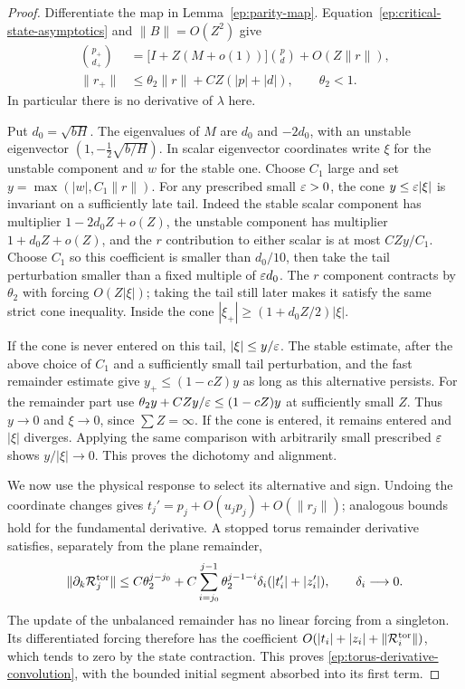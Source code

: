 \begin{proof}
Differentiate the map in Lemma~\ref{ep:parity-map}.
Equation~\eqref{ep:critical-state-asymptotics} and
$\|B\|=O(Z^2)$ give
\begin{align}
 \binom{p_+}{d_+}
 &=\bigl[I+Z(M+o(1))\bigr]\binom p d
       +O(Z\|r\|),\label{ep:critical-derivative}\\
 \|r_+\|&\le\theta_2\|r\|+
                     CZ(|p|+|d|),\qquad \theta_2<1.
                     \label{ep:derivative-remainder}
\end{align}
In particular there is no derivative of $\lambda$ here.

Put $d_0=\sqrt{bH}$.  The eigenvalues of $M$ are
$d_0$ and $-2d_0$, with an unstable eigenvector
$(1,-\frac12\sqrt{b/H})$.  In scalar eigenvector
coordinates write $\xi$ for the unstable component and
$w$ for the stable one.  Choose $C_1$ large and set
$y=\max(|w|,C_1\|r\|)$.
For any prescribed small $\varepsilon>0$, the cone
$y\le\varepsilon|\xi|$ is invariant on a sufficiently late tail.
Indeed the stable scalar component has multiplier
$1-2d_0Z+o(Z)$, the unstable component has multiplier
$1+d_0Z+o(Z)$, and the $r$ contribution to either scalar
is at most $CZy/C_1$.  Choose $C_1$ so this coefficient
is smaller than $d_0/10$, then take the tail perturbation
smaller than a fixed multiple of $\varepsilon d_0$.
The $r$ component contracts by $\theta_2$ with forcing
$O(Z|\xi|)$; taking the tail still later makes it satisfy
the same strict cone inequality.  Inside the cone
$|\xi_+|\ge(1+d_0Z/2)|\xi|$.

If the cone is never entered on this tail,
$|\xi|\le y/\varepsilon$.  The stable estimate, after the above
choice of $C_1$ and a sufficiently small tail perturbation,
and the fast remainder estimate give
$y_+\le(1-cZ)y$ as long as this alternative persists.
For the remainder part use
$\theta_2y+CZy/\varepsilon\le(1-cZ)y$ at sufficiently small $Z$.
Thus $y\to0$ and $\xi\to0$, since $\sum Z=\infty$.
If the cone is entered, it remains entered and $|\xi|$
diverges.  Applying the same comparison with arbitrarily
small prescribed $\varepsilon$ shows $y/|\xi|\to0$.
This proves the dichotomy and alignment.

We now use the physical response to select its alternative
and sign.  Undoing the coordinate changes gives
$t_j'=p_j+O(u_jp_j)+O(\|r_j\|)$; analogous bounds hold
for the fundamental derivative.  A stopped torus remainder
derivative satisfies, separately from the plane remainder,
\begin{equation}\label{ep:torus-derivative-convolution}
 \|\partial_k\mathcal R_j^{\rm tor}\|
 \le C\theta_2^{j-j_0}
 +C\sum_{i=j_0}^{j-1}\theta_2^{j-1-i}
       \delta_i(|t_i'|+|z_i'|),
 \qquad \delta_i\longrightarrow0 .
\end{equation}
The update of the unbalanced remainder has no linear forcing
from a singleton.  Its differentiated forcing therefore has
the coefficient
$O(|t_i|+|z_i|+\|\mathcal R_i^{\rm tor}\|)$,
which tends to zero by the state contraction.  This proves
\eqref{ep:torus-derivative-convolution}, with the bounded
initial segment absorbed into its first term.


\end{proof}
